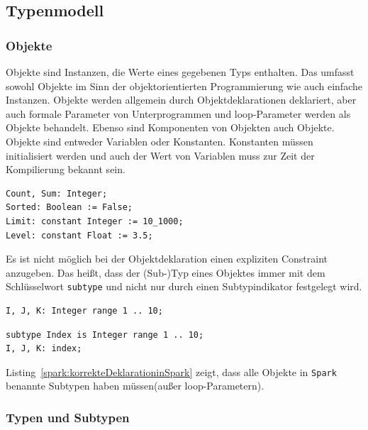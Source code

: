 \subsection{Typenmodell}
\label{subsec:Typenmodell}
\subsubsection{Objekte}
\label{subsubsec:Objekte}
Objekte sind Instanzen, die Werte eines gegebenen Typs enthalten. Das umfasst sowohl Objekte im Sinn der objektorientierten Programmierung wie auch einfache Instanzen. Objekte werden allgemein durch Objektdeklarationen deklariert, aber auch formale Parameter von Unterprogrammen und loop-Parameter werden als Objekte behandelt. Ebenso sind Komponenten von Objekten auch Objekte.\\
Objekte sind entweder Variablen oder Konstanten. Konstanten müssen initialisiert werden und auch der Wert von Variablen muss zur Zeit der Kompilierung bekannt sein.\\
\begin{lstlisting}[caption={Beispiele für einfache Objekte in Spark}, label=spark:einfacheObjekte]
Count, Sum: Integer;
Sorted: Boolean := False;
Limit: constant Integer := 10_1000;
Level: constant Float := 3.5;
\end{lstlisting}


Es ist nicht möglich bei der Objektdeklaration einen expliziten Constraint anzugeben. Das heißt, dass der (Sub-)Typ eines Objektes immer mit dem Schlüsselwort \texttt{subtype} und nicht nur durch einen Subtypindikator festgelegt wird.

\begin{lstlisting}[caption={Deklaration gültig in Ada, aber unzulässig in Spark}, label=ada:falscheDeklarationinAda]
I, J, K: Integer range 1 .. 10;
\end{lstlisting}

\begin{lstlisting}[caption={korrekte Deklaration in Spark}, label=spark:korrekteDeklarationinSpark]
subtype Index is Integer range 1 .. 10;
I, J, K: index;
\end{lstlisting}


Listing~\ref{spark:korrekteDeklarationinSpark} zeigt, dass alle Objekte in \texttt{Spark} benannte Subtypen haben müssen(außer loop-Parametern).

\newpage

\subsubsection{Typen und Subtypen}
\label{subsubsec:TypenUndSubtypen}


